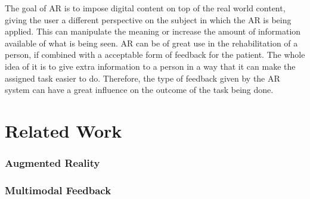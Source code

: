 \documentclass[runningheads,a4paper]{llncs}
\begin{document}
The goal of \ac{AR} is to impose digital content on top of the real world content,
giving the user a different perspective on the subject in which the \ac{AR} is being
applied. This can manipulate the meaning or increase the amount of information available
of what is being seen.
\ac{AR} can be of great use in the rehabilitation of a person, if combined 
with a acceptable form of feedback for the patient. The whole idea of it is to give extra information
to a person in a way that it can make the assigned task easier to do. 
Therefore, the type of feedback given by the \ac{AR} system can have a great influence 
on the outcome of the task being done.%





\section{Related Work}
\subsubsection{Augmented Reality}
\subsubsection{Multimodal Feedback}




\end{document}
